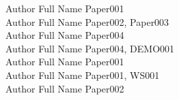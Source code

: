 \begin{multicols}{2}
Author Full Name \dotfill Paper001\\
Author Full Name \dotfill Paper002, Paper003\\
Author Full Name \dotfill Paper004\\
Author Full Name \dotfill Paper004, DEMO001\\
Author Full Name \dotfill Paper001\\
Author Full Name \dotfill Paper001, WS001\\
Author Full Name \dotfill Paper002\\
\end{multicols}